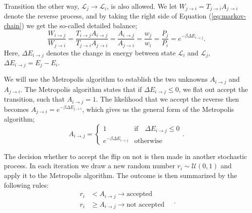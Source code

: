 \documentclass[]{article}
\begin{document}
Transition the other way, $\mathcal{L}_j \rightarrow \mathcal{L}_i$, is also allowed. We let $W_{j \rightarrow i} = T_{j \rightarrow i} A_{j \rightarrow i}$ denote the reverse process, and by taking the right side of Equation (\ref{eq:markov-chain}) we get the so-called detailed balance;
\begin{equation}
	\frac{W_{i \rightarrow j}}{W_{j \rightarrow i}} 
	= \frac{T_{i \rightarrow j} A_{i \rightarrow j}}{T_{j \rightarrow i} A_{j \rightarrow i}} 
	= \frac{A_{i \rightarrow j}}{A_{j \rightarrow i}}
	= \frac{w_j}{w_i} = \frac{P_j}{P_i} = e^{-\beta \Delta E_{i \rightarrow j}}.
\end{equation}
Here, $\Delta E_{i \rightarrow j}$ denotes the change in energy between state $\mathcal{L}_i$ and $\mathcal{L}_j$, $\Delta E_{i \rightarrow j} = E_j - E_i$. 

We will use the Metropolis algorithm to establish the two unknowns $A_{i \rightarrow j}$ and $A_{j \rightarrow i}$. The Metropolis algorithm states that if $\Delta E_{i \rightarrow j} \le 0$, we flat out accept the transition, such that $A_{i \rightarrow j} = 1$. The likelihood that we accept the reverse then becomes $A_{j \rightarrow i} = e^{-\beta \Delta E_{j \rightarrow i}}$, which gives us the general form of the Metropolis algorithm;
\begin{equation} \label{eq:metropolis}
	A_{i \rightarrow j} = 
	\begin{cases}
	1 &\text{if} \quad \Delta E_{i \rightarrow j} \le 0 \\
	e^{-\beta \Delta E_{i \rightarrow j}} &\text{otherwise}
	\end{cases}.
\end{equation}

The decision whether to accept the flip on not is then made in another stochastic process. In each iteration we draw a new random  number $r_i \sim \mathcal{U}(0,1)$ and apply it to the Metropolis algorithm. The outcome is then summarized by the following rules:
\begin{equation} \label{eq:metropolis-accept-or-not}
\begin{aligned}
	r_i &< A_{i \rightarrow j} \rightarrow \text{accepted} \\
	r_i &\ge A_{i \rightarrow j} \rightarrow \text{not accepted} \\
\end{aligned} \quad.
\end{equation}

\vspace{5mm}
\end{document}
